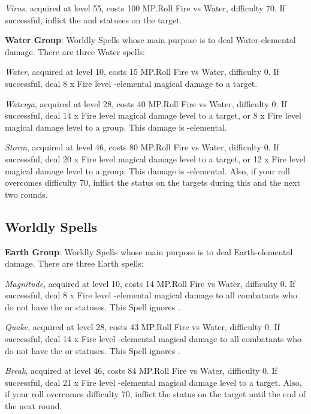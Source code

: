 \begin{multicols}{2}
    \textit{Virus}, acquired at level 55, costs 100 MP.\@{}Roll Fire vs Water, difficulty 70. If successful, inflict the  and  statuses on the target.
    
    \textbf{Water Group}: Worldly Spells whose main purpose is to deal Water-elemental damage. There are three Water spells:
    
    \textit{Water}, acquired at level 10, costs 15 MP.\@{}Roll Fire vs Water, difficulty 0. If successful, deal 8 x Fire level -elemental magical damage to a target.
    
    \textit{Waterga}, acquired at level 28, costs 40 MP.\@{}Roll Fire vs Water, difficulty 0. If successful, deal 14 x Fire level magical damage level to a target, or 8 x Fire level magical damage level to a group. This damage is -elemental.
    
    \textit{Storm}, acquired at level 46, costs 80 MP.\@{}Roll Fire vs Water, difficulty 0. If successful, deal 20 x Fire level magical damage level to a target, or 12 x Fire level magical damage level to a group. This damage is -elemental. Also, if your roll overcomes difficulty 70, inflict the  status on the targets during this and the next two rounds.
    
    \subsection{Worldly Spells}\label{subsec:black-worldly}

    \textbf{Earth Group}: Worldly Spells whose main purpose is to deal Earth-elemental damage. There are three Earth spells:
    
    \textit{Magnitude}, acquired at level 10, costs 14 MP.\@{}Roll Fire vs Water, difficulty 0. If successful, deal 8 x Fire level -elemental magical damage to all combatants who do not have the  or  statuses. This Spell ignores .
    
    \textit{Quake}, acquired at level 28, costs 43 MP.\@{}Roll Fire vs Water, difficulty 0. If successful, deal 14 x Fire level -elemental magical damage to all combatants who do not have the  or  statuses. This Spell ignores .
    
    \textit{Break}, acquired at level 46, costs 84 MP.\@{}Roll Fire vs Water, difficulty 0. If successful, deal 21 x Fire level -elemental magical damage level to a target. Also, if your roll overcomes difficulty 70, inflict the  status on the target until the end of the next round.
    

\end{multicols}
